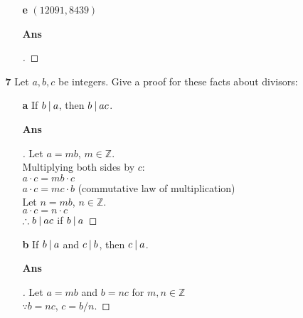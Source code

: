 \documentclass[paper=usletter, fontsize=12pt]{article}
\begin{document}
\begin{itemize}
\begin{itemize}
\begin{itemize}
                    \item[\textbf{e}] $(12091, 8439)$
                    \item[\textbf{Ans}]
                    \begin{proof}[\unskip\nopunct]
                    \end{proof}
                    \vspace{0.2in}

                \end{itemize}

                \item[\textbf{7}] Let $a, b, c$ be integers. Give a proof for
                these facts about divisors:

                \begin{itemize}

                    \item[\textbf{a}] If $b \:\vert\: a$, then $b \:\vert\: ac$.
                    \item[\textbf{Ans}]
                    \begin{proof}[\unskip\nopunct]
                        Let $a = mb$, $m \in \mathbb{Z}$. \\
                        Multiplying both sides by $c$: \\
                        $a \cdot c = mb \cdot c$ \\
                        $a \cdot c = mc \cdot b$ (commutative law of multiplication) \\
                        Let $n = mb$, $n \in \mathbb{Z}$. \\
                        $a \cdot c = n \cdot c$ \\
                        $\therefore b \:\vert\: ac$ if $b \:\vert\: a$ \qedhere
                    \end{proof}
                    \vspace{0.2in}

                    \item[\textbf{b}] If $b \:\vert\: a$ and $c \:\vert\: b$, then $c
                    \:\vert\: a$.
                    \item[\textbf{Ans}]
                    \begin{proof}[\unskip\nopunct]
                        Let $a = mb$ and $b = nc$ for $m, n \in \mathbb{Z}$ \\
                        $\because b = nc$, $c = b/n$.
                    \end{proof}
                    \vspace{0.2in}


\end{itemize}
\end{itemize}
\end{itemize}
\end{document}
